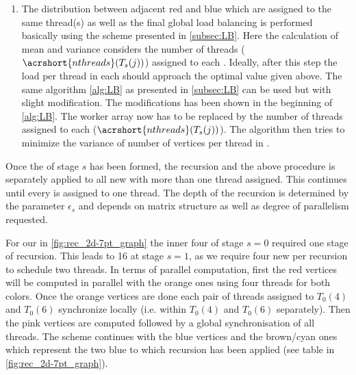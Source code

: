 \begin{enumerate}
	\item The distribution between adjacent red and blue \levelGroups which are assigned to the same thread(s) as well as the final global load balancing is performed basically using the scheme presented in \cref{subsec:LB}. 
	Here the calculation of mean and variance considers the number of threads ($\acrshort{nthreads}(T_{s}(j))$) assigned to each \levelGroup . Ideally, after this step the load per thread in each \levelGroup should approach the optimal value given above.
	The same algorithm \cref{alg:LB} as presented in \cref{subsec:LB} can be used but with slight modification. The modifications has been shown in the beginning of \cref{alg:LB}. The worker array now has to be replaced by the number of threads assigned to each \levelGroup ($\acrshort{nthreads}(T_{s}(j))$). The algorithm then tries to minimize the variance of number of vertices per thread in \levelGroups.
\end{enumerate}
Once the \levelGroup of stage $s$ has been formed, the recursion and the above procedure is separately applied to all new \levelGroups with more than one thread assigned. This continues until every \levelGroup is assigned to one thread. The depth of the recursion is determined by the parameter $\epsilon_s$ and depends on matrix structure as well as degree of parallelism requested. 

For our \stex in  \cref{fig:rec_2d-7pt_graph} the inner four \levelGroups of stage $s=0$ required one stage of recursion. This leads to 16 \levelGroups at stage $s=1$, as we require four new \levelGroups per recursion to schedule two threads. 
In terms of parallel computation, first the red vertices will be computed in parallel with the orange ones using four threads for both colors. Once the orange vertices are done each pair of threads assigned to $T_0(4)$ and $T_0(6)$ synchronize locally (i.e. within $T_0(4)$ and $T_0(6)$ separately). Then the pink vertices are computed followed by a global synchronisation of all threads. The scheme continues with the blue vertices and the brown/cyan ones which represent the two blue \levelGroups to which recursion has been applied (see table in \cref{fig:rec_2d-7pt_graph}).  

